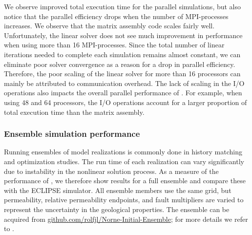 We observe improved total execution time for the parallel simulations, but also notice
that the parallel efficiency drops when the number of MPI-processes increases. 
{{\revised 
We observe that the matrix assembly code scales fairly well. 
Unfortunately, the linear solver does not see much improvement in
performance when using more than 16 MPI-processes. Since 
the total number of linear iterations needed to complete each simulation
remains almost constant, we can eliminate poor solver convergence as a
reason for a drop in parallel efficiency. }}
Therefore, the poor scaling of the linear solver
for more than 16 processors can mainly be attributed to communication overhead. The lack
of scaling in the I/O operations also impacts the overall parallel performance of
\opmflow. For example, when using 48 and 64 processors, the I/O operations account for a
larger proportion of total execution time than the matrix assembly.

\subsubsection{Ensemble simulation performance}

Running ensembles of model realizations is commonly done in history 
matching and optimization studies. The run time of each realization can vary 
significantly due to instability in the nonlinear solution process. As a measure of the 
performance of \opmflow, we therefore show results for a full 
ensemble and compare these with the ECLIPSE simulator. 
All ensemble members use the same grid, but permeability, relative permeability endpoints,
and fault multipliers are varied to represent the uncertainty in the geological properties. 
The ensemble can be acquired from \href{http://github.com/rolfjl/Norne-Initial-Ensemble}{github.com/rolfjl/Norne-Initial-Ensemble};
for more details we refer to  \cite{lorentzen2017history}. 

